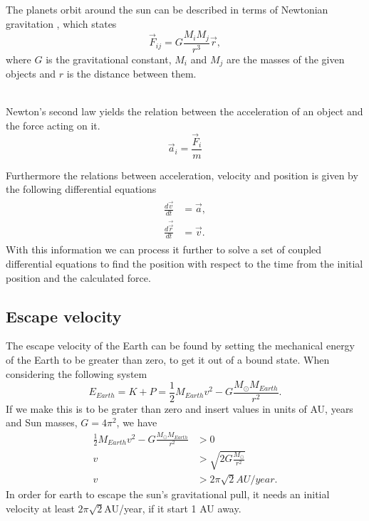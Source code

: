 \documentclass{article}
\begin{document}
The planets orbit around the sun can be described in terms of Newtonian gravitation , which states
\begin{equation}
\vec{F}_{ij} = G\frac{M_i M_j}{r^3}\vec{r}, \label{newton}
\end{equation}
where $G$ is the gravitational constant, $M_i$ and $M_j$ are the masses of the given objects and $r$ is the distance between them. \\\


Newton's second law yields the relation between the acceleration of an object and the force acting on it.
\begin{equation}
\vec{a}_i = \frac{\vec{F}_i}{m}
\end{equation}

Furthermore the relations between acceleration, velocity and position is given by the following differential equations
\begin{align}
  \begin{split}
\frac{d\vec{v}}{dt} &= \vec{a},\\
\frac{d\vec{\vec{r}}}{dt} &= \vec{v}. \label{coupled_diff}
  \end{split}
\end{align}
With this information we can process it further to solve a set of coupled differential equations to find the position with respect to the time from the initial position and the calculated force.


\subsection{Escape velocity}

The escape velocity of the Earth can be found by setting the mechanical energy of the Earth to be greater than zero, to get it out of a bound state. When considering the following system
\begin{equation}
E_{Earth} = K + P = \frac{1}{2}M_{Earth}v^2 -G\frac{M_\odot M_{Earth}}{r^2}.
\end{equation}
If we make this is to be grater than zero and insert values in units of AU, years and Sun masses, $G = 4\pi^2$, we have
\begin{align}
\frac{1}{2}M_{Earth}v^2 -G\frac{M_\odot M_{Earth}}{r^2} &> 0\\
v &> \sqrt{2G\frac{M_\odot }{r^2}}\\
v &> 2\pi\sqrt{2}AU/year.
\end{align}
In order for earth to escape the sun's gravitational pull, it needs an initial velocity at least $2\pi\sqrt{2}$AU/year, if it start 1 AU away.
\end{document}
